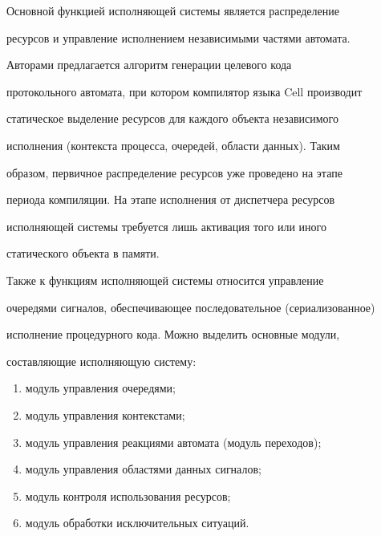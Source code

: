       


      Основной функцией исполняющей сис\-те\-мы является распределение 


ресурсов и управление исполнением независимыми частями автомата.


      


      Авторами предлагается алгоритм генерации целевого кода 


протокольного автомата, при котором компилятор языка Cell производит 


статическое выделение ресурсов для каждого объекта независимого 


исполнения (контекста процесса, очередей, области данных). Таким 


образом, первичное распределение ресурсов уже проведено на этапе 


периода компиляции. На этапе исполнения от диспетчера ресурсов 


исполняющей сис\-те\-мы требуется лишь активация того или иного 


статического объекта в памяти.


      


      Также к функциям исполняющей сис\-те\-мы относится управление 


очередями сигналов, обеспечивающее последовательное (сериализованное) 


исполнение процедурного кода. Можно выделить основные модули, 


составляющие исполняющую систему:


      \begin{enumerate}[(1)]


      \item модуль управления очередями;


      \item модуль управления контекстами;


      \item модуль управления реакциями автомата (модуль переходов);


      \item модуль управления областями данных сигналов;


      \item модуль контроля использования ресурсов;


      \item модуль обработки исключительных ситуаций.


      \end{enumerate}



